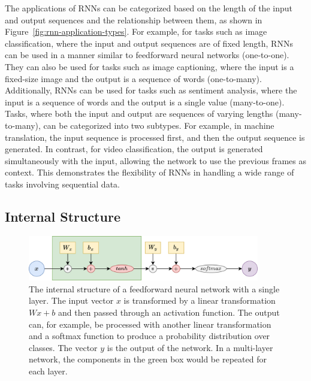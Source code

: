 \documentclass{article}
\newcommand{\reffig}[1]{Figure~\ref{#1}}
\begin{document}
The applications of RNNs can be categorized based on the length of the input and output
sequences and the relationship between them, as shown in
\reffig{fig:rnn-application-types}. For example, for tasks such as image classification,
where the input and output sequences are of fixed length, RNNs can be used in a manner
similar to feedforward neural networks (one-to-one). They can also be used for tasks such
as image captioning, where the input is a fixed-size image and the output is a sequence of
words (one-to-many). Additionally, RNNs can be used for tasks such as sentiment analysis,
where the input is a sequence of words and the output is a single value (many-to-one).
Tasks, where both the input and output are sequences of varying lengths (many-to-many),
can be categorized into two subtypes. For example, in machine translation, the input
sequence is processed first, and then the output sequence is generated. In contrast, for
video classification, the output is generated simultaneously with the input, allowing the
network to use the previous frames as context. This demonstrates the flexibility of RNNs
in handling a wide range of tasks involving sequential data.



\subsection{Internal Structure}
\label{sec:2.1}

\begin{figure}[htbp]
  \centering
  \includegraphics[width=0.9\textwidth]{Block Diagram Feedforward.drawio.png}
  \caption{The internal structure of a feedforward neural network with a single layer. The
    input vector $x$ is transformed by a linear transformation $Wx + b$ and then passed
    through an activation function. The output can, for example, be processed with another
    linear transformation and a softmax function to produce a probability distribution
    over classes. The vector $y$ is the output of the network. In a multi-layer network,
    the components in the green box would be repeated for each layer.}
  \label{fig:internal-feedforward}
\end{figure}
\end{document}
